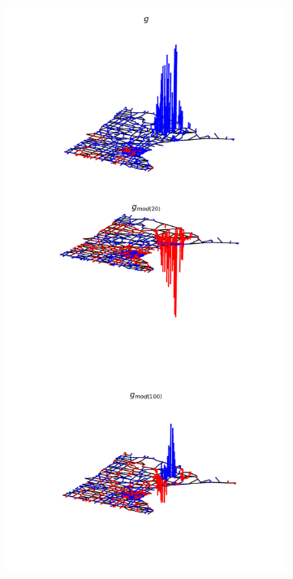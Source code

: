 \documentclass{beamer}
\begin{document}
\begin{frame}
\begin{columns}
\begin{column}{0.5\textwidth}
\begin{figure}
\end{figure}
  \end{column}
    \begin{column}{0.5\textwidth}
\begin{figure}
\includegraphics[trim={0 0 0 20cm},clip,width=\linewidth]{../img/basic_operations_3.pdf}
\end{figure}
  \end{column}
  \end{columns}
\end{frame}
\end{document}
